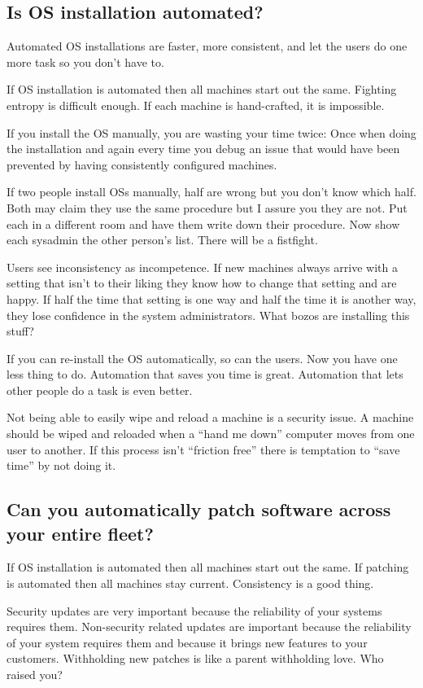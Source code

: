 \documentclass{article}
\begin{document}
\subsection{Is OS installation automated?}
Automated OS installations are faster, more consistent, and let the users do one more task so you don't have to.

If OS installation is automated then all machines start out the same. Fighting entropy is difficult enough. If each machine is hand-crafted, it is impossible.

If you install the OS manually, you are wasting your time twice: Once when doing the installation and again every time you debug an issue that would have been prevented by having consistently configured machines.

If two people install OSs manually, half are wrong but you don't know which half. Both may claim they use the same procedure but I assure you they are not. Put each in a different room and have them write down their procedure. Now show each sysadmin the other person's list. There will be a fistfight.

Users see inconsistency as incompetence. If new machines always arrive with a setting that isn't to their liking they know how to change that setting and are happy. If half the time that setting is one way and half the time it is another way, they lose confidence in the system administrators. What bozos are installing this stuff?

If you can re-install the OS automatically, so can the users. Now you have one less thing to do. Automation that saves you time is great. Automation that lets other people do a task is even better.

Not being able to easily wipe and reload a machine is a security issue. A machine should be wiped and reloaded when a ``hand me down'' computer moves from one user to another. If this process isn't ``friction free'' there is temptation to ``save time'' by not doing it.

\subsection{Can you automatically patch software across your entire fleet?}
If OS installation is automated then all machines start out the same. If patching is automated then all machines stay current. Consistency is a good thing.

Security updates are very important because the reliability of your systems requires them. Non-security related updates are important because the reliability of your system requires them and because it brings new features to your customers. Withholding new patches is like a parent withholding love. Who raised you?
\end{document}
